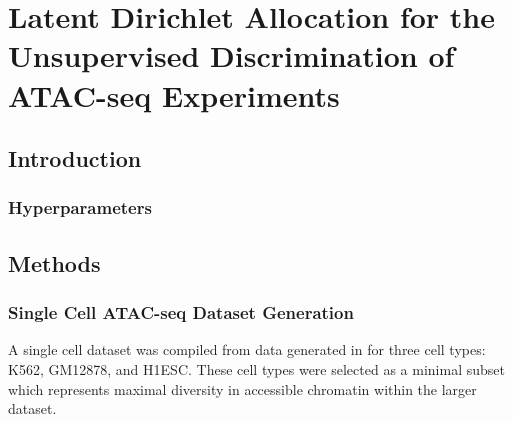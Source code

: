 

\chapter{\label{ch:1-intro} Latent Dirichlet Allocation for the Unsupervised Discrimination of ATAC-seq Experiments}

\minitoc

\providecommand{\tightlist}{%
  \setlength{\itemsep}{0pt}\setlength{\parskip}{0pt}}


\section{Introduction} \label{ch4:intro}



\subsection{Hyperparameters}

\section{Methods} \label{ch4:methods}


\subsection{Single Cell ATAC-seq Dataset Generation} \label{methods:sc_ds}

A single cell dataset was compiled from data generated in \textcite{Buenrostro2015} for three cell types: K562, GM12878, and H1ESC. These cell types were selected as a minimal subset which represents maximal diversity in accessible chromatin within the larger dataset. 

